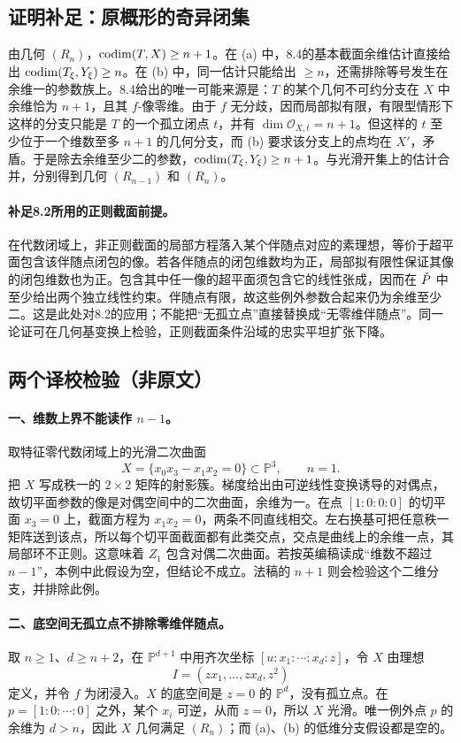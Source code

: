 \subsection*{证明补足：原概形的奇异闭集}
由几何 $(R_n)$，$\operatorname{codim}(T,X)\ge n+1$。在 (a) 中，8.4的基本截面余维估计直接给出 $\operatorname{codim}(T_\xi,Y_\xi)\ge n$。在 (b) 中，同一估计只能给出 $\ge n$，还需排除等号发生在余维一的参数族上。8.4给出的唯一可能来源是：$T$ 的某个几何不可约分支在 $X$ 中余维恰为 $n+1$，且其 $f$-像零维。由于 $f$ 无分歧，因而局部拟有限，有限型情形下这样的分支只能是 $T$ 的一个孤立闭点 $t$，并有 $\dim\mathcal O_{X,t}=n+1$。但这样的 $t$ 至少位于一个维数至多 $n+1$ 的几何分支，而 (b) 要求该分支上的点均在 $X'$，矛盾。于是除去余维至少二的参数，$\operatorname{codim}(T_\xi,Y_\xi)\ge n+1$。与光滑开集上的估计合并，分别得到几何 $(R_{n-1})$ 和 $(R_n)$。

\paragraph{补足8.2所用的正则截面前提。}
在代数闭域上，非正则截面的局部方程落入某个伴随点对应的素理想，等价于超平面包含该伴随点闭包的像。若各伴随点的闭包维数均为正，局部拟有限性保证其像的闭包维数也为正。包含其中任一像的超平面须包含它的线性张成，因而在 $\check P$ 中至少给出两个独立线性约束。伴随点有限，故这些例外参数合起来仍为余维至少二。这是此处对8.2的应用；不能把“无孤立点”直接替换成“无零维伴随点”。同一论证可在几何基变换上检验，正则截面条件沿域的忠实平坦扩张下降。

\subsection*{两个译校检验（非原文）}
\paragraph{一、维数上界不能读作 $n-1$。}
取特征零代数闭域上的光滑二次曲面
\[
 X=\{x_0x_3-x_1x_2=0\}\subset\mathbb P^3,\qquad n=1.
\]
把 $X$ 写成秩一的 $2\times2$ 矩阵的射影簇。梯度给出由可逆线性变换诱导的对偶点，故切平面参数的像是对偶空间中的二次曲面，余维为一。在点 $[1:0:0:0]$ 的切平面 $x_3=0$ 上，截面方程为 $x_1x_2=0$，两条不同直线相交。左右换基可把任意秩一矩阵送到该点，所以每个切平面截面都有此类交点，交点是曲线上的余维一点，其局部环不正则。这意味着 $Z_1$ 包含对偶二次曲面。若按英编稿读成“维数不超过 $n-1$”，本例中此假设为空，但结论不成立。法稿的 $n+1$ 则会检验这个二维分支，并排除此例。

\paragraph{二、底空间无孤立点不排除零维伴随点。}
取 $n\ge1$、$d\ge n+2$，在 $\mathbb P^{d+1}$ 中用齐次坐标 $[u:x_1:\cdots:x_d:z]$，令 $X$ 由理想
\[
 I=(zx_1,\ldots,zx_d,z^2)
\]
定义，并令 $f$ 为闭浸入。$X$ 的底空间是 $z=0$ 的 $\mathbb P^d$，没有孤立点。在 $p=[1:0:\cdots:0]$ 之外，某个 $x_i$ 可逆，从而 $z=0$，所以 $X$ 光滑。唯一例外点 $p$ 的余维为 $d>n$，因此 $X$ 几何满足 $(R_n)$；而 (a)、(b) 的低维分支假设都是空的。

